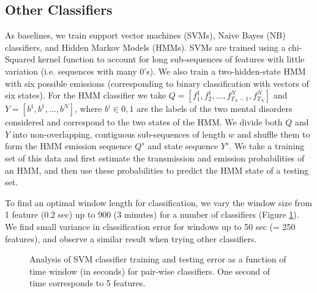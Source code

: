 \documentclass[10pt,twocolumn,letterpaper]{article}
\begin{document}
\subsection {Other Classifiers}
As baselines, we train support vector machines (SVMs), Naive Bayes (NB) classifiers, and Hidden Markov Models (HMMs). SVMs are trained using a chi-Squared kernel function to account for long sub-sequences of features with little variation (i.e. sequences with many 0's). We also train a two-hidden-state HMM with six possible emissions (corresponding to binary classification with vectors of six states). For the HMM classifier we take $Q=[f_1^1, f_2^1,...,f_{T_N-1}^N,f_{T_N}^N]$ and $Y=[b^1, b^1, ...,b^N]$, where $b^i \in {0,1}$ are the labels of the two mental disorders considered and correspond to the two states of the HMM. We divide both $Q$ and $Y$ into non-overlapping, contiguous sub-sequences of length $w$ and shuffle them to form the HMM emission sequence $Q^{s}$ and state sequence $Y^s$. We take a training set of this data and first estimate the transmission and emission probabilities of an HMM, and then use these probabilities to predict the HMM state of a testing set. 

To find an optimal window length for classification, we vary the window size from 1 feature (0.2 sec) up to 900 (3 minutes) for a number of classifiers (Figure \ref{fig:window_lengths}). We find small variance in classification error for windows up to 50 sec (= 250 features), and observe a similar result when trying other classifiers.

\begin{figure}[h]
        \centering
  
            \hfill
               \caption{Analysis of SVM classifier training and testing error as a function of time window  (in seconds) for pair-wise classifiers. One second of time corresponds to 5 features.}
        \label{fig:window_lengths}
\end{figure}
\end{document}
